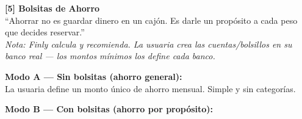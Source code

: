 \documentclass[a4paper,11pt]{article}
\begin{document}
\vspace{0.4cm}

\begin{mdframed}[backgroundcolor=cgreen!3,linecolor=cgreen!30,linewidth=1pt,roundcorner=6pt]
\textbf{\color{cgreen!60!black}[5] Bolsitas de Ahorro}\\[4pt]
\textcolor{cdark!70}{\small``Ahorrar no es guardar dinero en un caj\'on.
Es darle un prop\'osito a cada peso que decides reservar.''}\\[3pt]
\textcolor{cdark!60}{\scriptsize \textit{Nota: Finly calcula y recomienda. La usuaria crea las cuentas/bolsillos en su banco real
--- los montos m\'inimos los define cada banco.}}

\vspace{6pt}
\textbf{\color{cdark!70}\small Modo A --- Sin bolsitas (ahorro general):}\\[2pt]
\textcolor{cdark!60}{\small La usuaria define un monto \'unico de ahorro mensual. Simple y sin categor\'ias.}

\vspace{6pt}
\textbf{\color{cdark!70}\small Modo B --- Con bolsitas (ahorro por prop\'osito):}\\[4pt]


\end{mdframed}
\end{document}
